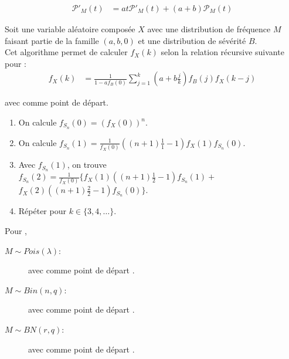 \documentclass[10pt, french]{article}
\begin{document}
\begin{multicols*}{2}
\begin{definitionNOHFILLsub}
\begin{align*}
	\mathcal{P}'_{M}(t)
	&=	at\mathcal{P}'_{M}(t) + (a + b)\mathcal{P}_{M}(t)
\end{align*}
\end{definitionNOHFILLsub}

\begin{algo2}
Soit une variable aléatoire composée $X$ avec une distribution de fréquence $M$ faisant partie de la famille $(a, b, 0)$ et une distribution de sévérité $B$.\\

Cet algorithme permet de calculer $f_{X}(k)$ selon la relation récursive suivante pour :
\begin{align*}
	f_{X}(k)
	&=	\frac{1}{1 - af_{B}(0)} \sum_{j = 1}^{k} \left(a + b\frac{j}{k}\right)f_{B}(j)f_{X}(k - j)
\end{align*}

avec  comme point de départ.

\tcbline

\begin{enumerate}
	\item	On calcule $f_{S_{n}}(0)	=	\left(f_{X}(0)\right)^{n}$.
	\item	On calcule $f_{S_{n}}(1)	=	\frac{1}{f_{X}(0)} \left((n + 1)\frac{1}{1} - 1\right)f_{X}(1)f_{S_{n}}(0)$.
	\item	Avec $f_{S_{n}}(1)$, on trouve $f_{S_{n}}(2)	=	\frac{1}{f_{X}(0)} \bigg\{ f_{X}(1)\left((n + 1)\frac{1}{2} - 1\right)f_{S_{n}}(1)	+$ $ f_{X}(2)\left((n + 1)\frac{2}{2} - 1\right)f_{S_{n}}(0) \bigg\}$.
	\item	Répéter pour $k \in \{3, 4, \dots\}$.
\end{enumerate}
\end{algo2}

Pour , 
\begin{description}
	\item[$M \sim Pois(\lambda)$:]	 avec comme point de départ .
	\item[$M \sim Bin(n, q)$:]	 avec comme point de départ .
	\item[$M \sim BN(r, q)$:]	 avec comme point de départ .
\end{description}



\end{multicols*}
\end{document}
